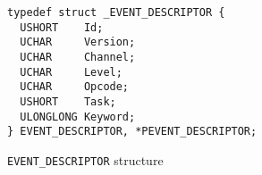 \documentclass{report}
\begin{document}
\begin{listing}[H]
    \begin{verbatim}
typedef struct _EVENT_DESCRIPTOR {
  USHORT    Id;
  UCHAR     Version;
  UCHAR     Channel;
  UCHAR     Level;
  UCHAR     Opcode;
  USHORT    Task;
  ULONGLONG Keyword;
} EVENT_DESCRIPTOR, *PEVENT_DESCRIPTOR;
\end{verbatim}
\caption{\texttt{EVENT_DESCRIPTOR} structure\cite{url:etw:etw-event-descriptor}}
\label{listing:detection:etw:event-descriptor}
\end{listing}
\end{document}
